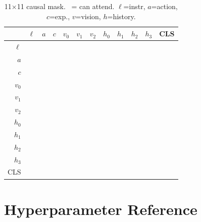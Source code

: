 \documentclass{article}
\newcommand{\cmark}{\ding{51}}
\newcommand{\xmark}{\ding{55}}
\begin{document}
\begin{table}[h]
\centering
\caption{11$\times$11 causal mask. \cmark\ = can attend.
         $\ell$=instr, $a$=action, $c$=exp., $v$=vision, $h$=history.}
\label{tab:mask}
\scriptsize
\setlength{\tabcolsep}{3.5pt}
\begin{tabular}{r|ccccccccccc}
\toprule
 & $\ell$ & $a$ & $c$ & $v_0$ & $v_1$ & $v_2$ & $h_0$ & $h_1$ & $h_2$ & $h_3$ & CLS \\
\midrule
$\ell$   & \cmark&\xmark&\xmark&\xmark&\xmark&\xmark&\xmark&\xmark&\xmark&\xmark&\xmark \\
$a$      & \cmark&\cmark&\xmark&\xmark&\xmark&\xmark&\xmark&\xmark&\xmark&\xmark&\xmark \\
$c$      & \cmark&\cmark&\cmark&\xmark&\xmark&\xmark&\xmark&\xmark&\xmark&\xmark&\xmark \\
$v_0$    & \cmark&\cmark&\cmark&\cmark&\xmark&\xmark&\xmark&\xmark&\xmark&\xmark&\xmark \\
$v_1$    & \cmark&\cmark&\cmark&\cmark&\cmark&\xmark&\xmark&\xmark&\xmark&\xmark&\xmark \\
$v_2$    & \cmark&\cmark&\cmark&\cmark&\cmark&\cmark&\xmark&\xmark&\xmark&\xmark&\xmark \\
$h_0$    & \cmark&\cmark&\cmark&\cmark&\cmark&\cmark&\cmark&\xmark&\xmark&\xmark&\xmark \\
$h_1$    & \cmark&\cmark&\cmark&\cmark&\cmark&\cmark&\cmark&\cmark&\xmark&\xmark&\xmark \\
$h_2$    & \cmark&\cmark&\cmark&\cmark&\cmark&\cmark&\cmark&\cmark&\cmark&\xmark&\xmark \\
$h_3$    & \cmark&\cmark&\cmark&\cmark&\cmark&\cmark&\cmark&\cmark&\cmark&\cmark&\xmark \\
CLS      & \cmark&\cmark&\cmark&\cmark&\cmark&\cmark&\cmark&\cmark&\cmark&\cmark&\cmark \\
\bottomrule
\end{tabular}
\end{table}

\section{Hyperparameter Reference}
\label{app:hparams}
\end{document}
